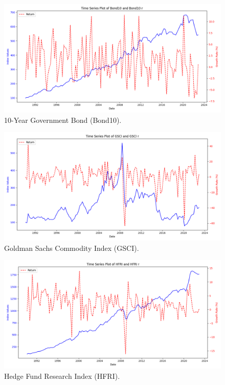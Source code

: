 \documentclass[12pt]{article}
\begin{document}
\begin{figure}[H]
    \centering
    \includegraphics[width=1\linewidth]{plot_Bond10.png}
    \caption{10-Year Government Bond (Bond10).}
    \label{fig:bond10}
\end{figure}

\begin{figure}[H]
    \centering
    \includegraphics[width=1\linewidth]{plot_GSCI.png}
    \caption{Goldman Sachs Commodity Index (GSCI).}
    \label{fig:gsci}
\end{figure}

\begin{figure}[H]
    \centering
    \includegraphics[width=1\linewidth]{plot_HFRI.png}
    \caption{Hedge Fund Research Index (HFRI).}
    \label{fig:hfri}
\end{figure}
\end{document}
